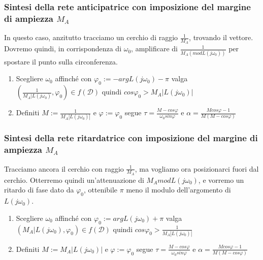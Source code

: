 \documentclass[11pt]{article}
\begin{document}
\subsubsection{Sintesi della rete anticipatrice con imposizione del margine di ampiezza $M_A$}
In questo caso, anzitutto tracciamo un cerchio di raggio $\frac{1}{M_A}$, trovando il vettore. Dovremo quindi, in corrispondenza di $\omega_0$, amplificare di $\frac{1}{M_A(mod L(j\omega_0))}$ per spostare il punto sulla circonferenza. 
\begin{enumerate}
    \item Scegliere $\omega_0$ affinché con $\varphi_0 := - argL(j\omega_0)-\pi$ valga $\left(\frac{1}{M_A|L(j\omega_0)}, \varphi_0\right) \in f(\mathcal{D})$ quindi $cos\varphi_0 > M_A|L(j\omega_0)|$
    \item Definiti $M:=\frac{1}{M_A|L(j\omega_0)|}$ e $\varphi := \varphi_0$ segue $\tau = \frac{M-cos\varphi}{\omega_0 sin\varphi} $ e $\alpha=\frac{Mcos\varphi-1}{M(M-cos\varphi)}$
\end{enumerate}
\subsubsection{Sintesi della rete ritardatrice con imposizione del margine di ampiezza $M_A$}
Tracciamo ancora il cerchio con raggio $\frac{1}{M_A}$, ma vogliamo ora posizionarci fuori dal cerchio. Otterremo quindi un'attenuazione di $M_A modL(j\omega_0)$, e vorremo un ritardo di fase dato da $\varphi_0$, ottenibile $\pi$ meno il modulo dell'argomento di $L(j\omega_0)$. 
\begin{enumerate}
    \item Scegliere $\omega_0$ affinché con $\varphi_0 := argL(j\omega_0)+\pi$ valga $\left(M_A|L(j\omega_0), \varphi_0\right) \in f(\mathcal{D})$ quindi $cos\varphi_0 > \frac{1}{M_A|L(j\omega_0)|}$
    \item Definiti $M:=M_A|L(j\omega_0)|$ e $\varphi := \varphi_0$ segue $\tau = \frac{M-cos\varphi}{\omega_0 sin\varphi} $ e $\alpha=\frac{Mcos\varphi-1}{M(M-cos\varphi)}$
\end{enumerate}
\end{document}
